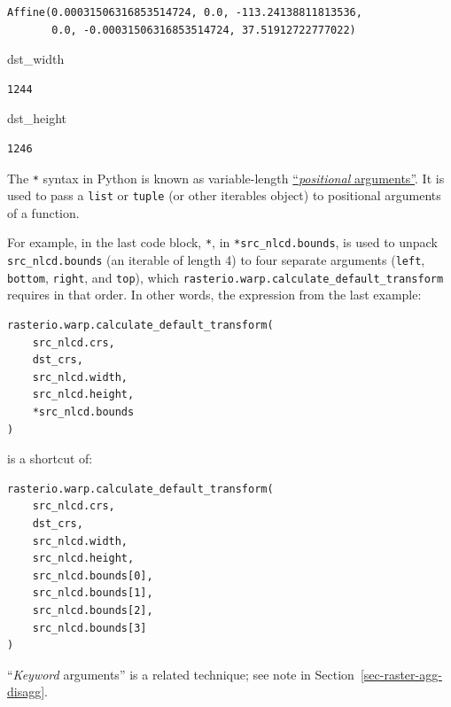 \documentclass[
  letterpaper,
]{krantz}
\newenvironment{Shaded}{\begin{snugshade}}{\end{snugshade}}
\newcommand{\NormalTok}[1]{\textcolor[rgb]{0.00,0.23,0.31}{#1}}
\begin{document}
\begin{verbatim}
Affine(0.00031506316853514724, 0.0, -113.24138811813536,
       0.0, -0.00031506316853514724, 37.51912722777022)
\end{verbatim}

\begin{Shaded}
\begin{Highlighting}[]
\NormalTok{dst\_width}
\end{Highlighting}
\end{Shaded}

\begin{verbatim}
1244
\end{verbatim}

\begin{Shaded}
\begin{Highlighting}[]
\NormalTok{dst\_height}
\end{Highlighting}
\end{Shaded}

\begin{verbatim}
1246
\end{verbatim}

\begin{tcolorbox}[enhanced jigsaw, title=\textcolor{quarto-callout-note-color}{\faInfo}\hspace{0.5em}{Note}, arc=.35mm, toprule=.15mm, titlerule=0mm, colframe=quarto-callout-note-color-frame, breakable, toptitle=1mm, bottomtitle=1mm, rightrule=.15mm, colbacktitle=quarto-callout-note-color!10!white, leftrule=.75mm, left=2mm, bottomrule=.15mm, opacityback=0, coltitle=black, opacitybacktitle=0.6, colback=white]

The \texttt{*} syntax in Python is known as variable-length
\href{https://docs.python.org/3/glossary.html\#term-argument}{``\emph{positional}
arguments''}. It is used to pass a \texttt{list} or \texttt{tuple} (or
other iterables object) to positional arguments of a function.

For example, in the last code block, \texttt{*}, in
\texttt{*src\_nlcd.bounds}, is used to unpack \texttt{src\_nlcd.bounds}
(an iterable of length 4) to four separate arguments (\texttt{left},
\texttt{bottom}, \texttt{right}, and \texttt{top}), which
\texttt{rasterio.warp.calculate\_default\_transform} requires in that
order. In other words, the expression from the last example:

\begin{verbatim}
rasterio.warp.calculate_default_transform(
    src_nlcd.crs,
    dst_crs,
    src_nlcd.width,
    src_nlcd.height,
    *src_nlcd.bounds
)
\end{verbatim}

is a shortcut of:

\begin{verbatim}
rasterio.warp.calculate_default_transform(
    src_nlcd.crs,
    dst_crs,
    src_nlcd.width,
    src_nlcd.height,
    src_nlcd.bounds[0],
    src_nlcd.bounds[1],
    src_nlcd.bounds[2],
    src_nlcd.bounds[3]
)
\end{verbatim}

``\emph{Keyword} arguments'' is a related technique; see note in
Section~\ref{sec-raster-agg-disagg}.

\end{tcolorbox}
\end{document}

